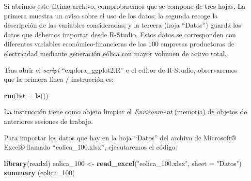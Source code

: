 \documentclass[
]{book}
\newenvironment{Shaded}{\begin{snugshade}}{\end{snugshade}}
\newcommand{\AttributeTok}[1]{\textcolor[rgb]{0.13,0.29,0.53}{#1}}
\newcommand{\FunctionTok}[1]{\textcolor[rgb]{0.13,0.29,0.53}{\textbf{#1}}}
\newcommand{\NormalTok}[1]{#1}
\newcommand{\OtherTok}[1]{\textcolor[rgb]{0.56,0.35,0.01}{#1}}
\newcommand{\StringTok}[1]{\textcolor[rgb]{0.31,0.60,0.02}{#1}}
\begin{document}
Si abrimos este último archivo, comprobaremos que se compone de tres hojas. La primera muestra un aviso sobre el uso de los datos; la segunda recoge la descripción de las variables consideradas; y la tercera (hoja ``Datos'') guarda los datos que debemos importar desde R-Studio. Estos datos se corresponden con diferentes variables económico-financieras de las 100 empresas productoras de electricidad mediante generación eólica con mayor volumen de activo total.

Tras abrir el \emph{script} ``explora\_ggplot2.R'' e el editor de R-Studio, observaremos que la primera línea / instrucción es:

\begin{Shaded}
\begin{Highlighting}[]
\FunctionTok{rm}\NormalTok{(}\AttributeTok{list =} \FunctionTok{ls}\NormalTok{())}
\end{Highlighting}
\end{Shaded}

La instrucción tiene como objeto limpiar el \emph{Environment} (memoria) de objetos de anteriores sesiones de trabajo.

Para importar los datos que hay en la hoja ``Datos'' del archivo de Microsoft® Excel® llamado ``eolica\_100.xlsx'', ejecutaremos el código:

\begin{Shaded}
\begin{Highlighting}[]
\FunctionTok{library}\NormalTok{(readxl)}
\NormalTok{eolica\_100 }\OtherTok{\textless{}{-}} \FunctionTok{read\_excel}\NormalTok{(}\StringTok{"eolica\_100.xlsx"}\NormalTok{, }\AttributeTok{sheet =} \StringTok{"Datos"}\NormalTok{)}
\FunctionTok{summary}\NormalTok{ (eolica\_100)}
\end{Highlighting}
\end{Shaded}
\end{document}
